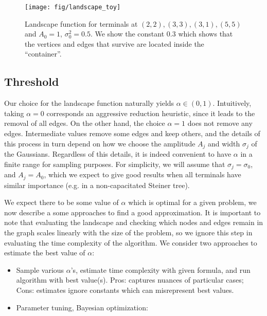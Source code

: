 \documentclass[12pt]{article}
\def\TA#1{{\color{red}{[#1]}}}
\begin{document}
\begin{figure}[th]
\centering
\texttt{[image: fig/landscape\_toy]}
\caption{Landscape function for terminals at $(2, 2), (3, 3), (3, 1), (5, 5)$ and $A_0 = 1$, $\sigma_0^2 = 0.5$. We show the constant $0.3$
which shows that the vertices and edges that survive are located inside the ``container''. }
\label{fig:land1}
\end{figure}


\subsection{Threshold}

Our choice for the landscape function naturally yields $\alpha \in (0,1)$. Intuitively, taking  $\alpha = 0$ corresponds
an aggressive reduction heuristic, since it leads to the removal of all edges. On the other hand, the choice $\alpha = 1$ 
does not remove any edges. 
%
Intermediate values remove some edges and keep others, and the details of this process in turn depend on how we choose the 
amplitude $A_j$ and width $\sigma_j$ of the Gaussians. Regardless of this details, it is indeed convenient to have $\alpha$ in 
a finite range for sampling purposes. 
%
For simplicity, we will assume that $\sigma_j = \sigma_0$, and $A_j = A_0$, which we expect to give good results when all terminals
have similar importance (e.g. in a non-capacitated Steiner tree).  

We expect there to be some value of $\alpha$ which is optimal for a given problem, we now describe a some approaches to find
a good approximation. It is important to note that evaluating the landscape and checking which nodes and edges remain in the graph
scales linearly with the size of the problem, so we ignore this step in evaluating the time complexity of the algorithm. 
%
We consider two approaches to estimate the best value of $\alpha$:

\begin{itemize}

\item Sample various $\alpha$'s, estimate time complexity with given formula, and run algorithm with best value(s). 
Pros: captures nuances of particular cases; Cons: estimates ignore constants which can misrepresent best values. 

\item Parameter tuning, Bayesian optimization: \TA{Pato?}

\end{itemize}
\end{document}
